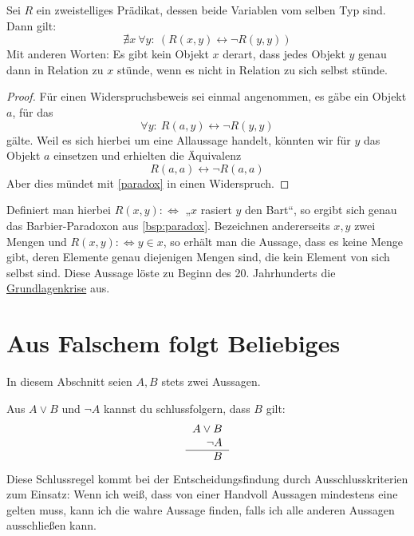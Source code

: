 \begin{satz} \label{russell} 
    Sei $R$ ein zweistelliges Prädikat, dessen beide Variablen vom selben Typ sind. Dann gilt:
        \[ \nexists x\ \forall y:\ (R(x,y) \leftrightarrow \neg R(y,y))\]
    Mit anderen Worten: Es gibt kein Objekt $x$ derart, dass jedes Objekt $y$ genau dann in Relation zu $x$ stünde, wenn es nicht in Relation zu sich selbst stünde.
\end{satz}
\begin{proof}
    Für einen Widerspruchsbeweis sei einmal angenommen, es gäbe ein Objekt $a$, für das
        \[ \forall y:\ R(a,y) \leftrightarrow \neg R(y,y) \]
    gälte. Weil es sich hierbei um eine Allaussage handelt, könnten wir für $y$ das Objekt $a$ einsetzen und erhielten die Äquivalenz
        \[ R(a,a) \leftrightarrow \neg R(a,a) \]
    Aber dies mündet mit \cref{paradox} in einen Widerspruch.
\end{proof}
 

\begin{bem}[*]
    Definiert man hierbei $R(x,y):\Leftrightarrow$ „$x$ rasiert $y$ den Bart“, so ergibt sich genau das Barbier-Paradoxon aus \cref{bsp:paradox}. Bezeichnen andererseits $x,y$ zwei Mengen und $R(x,y):\Leftrightarrow y\in x$, so erhält man die Aussage, dass es keine Menge gibt, deren Elemente genau diejenigen Mengen sind, die kein Element von sich selbst sind. Diese Aussage löste zu Beginn des 20. Jahrhunderts die \href{https://de.wikipedia.org/wiki/Grundlagenkrise_der_Mathematik}{Grundlagenkrise} aus.
\end{bem}
  
  

  
    
\section{Aus Falschem folgt Beliebiges}


In diesem Abschnitt seien $A,B$ stets zwei Aussagen.


\begin{axiom} \label{modustp}
    Aus $A\lor B$ und $\neg A$ kannst du schlussfolgern, dass $B$ gilt:
    \[\begin{tabular}{r}
        $A\lor B$ \\
        $\neg A$ \\
        \hline 
        $B$
    \end{tabular} \]
    Diese Schlussregel kommt bei der Entscheidungsfindung durch Ausschlusskriterien zum Einsatz: Wenn ich weiß, dass von einer Handvoll Aussagen mindestens eine gelten muss, kann ich die wahre Aussage finden, falls ich alle anderen Aussagen ausschließen kann.
\end{axiom}


